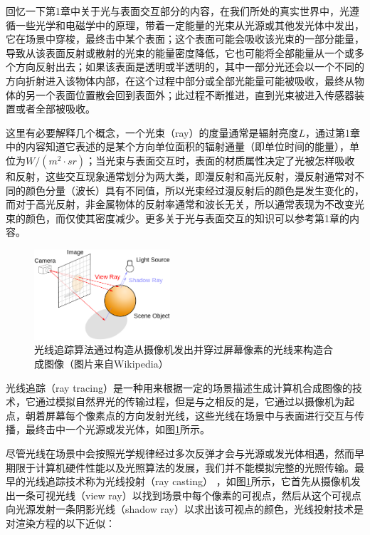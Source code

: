 回忆一下第1章中关于光与表面交互部分的内容，在我们所处的真实世界中，光遵循一些光学和电磁学中的原理，带着一定能量的光束从光源或其他发光体中发出，它在场景中穿梭，最终击中某个表面；这个表面可能会吸收该光束的一部分能量，导致从该表面反射或散射的光束的能量密度降低，它也可能将全部能量从一个或多个方向反射出去；如果该表面是透明或半透明的，其中一部分光还会以一个不同的方向折射进入该物体内部，在这个过程中部分或全部光能量可能被吸收，最终从物体的另一个表面位置散会回到表面外；此过程不断推进，直到光束被进入传感器装置或者全部被吸收。

这里有必要解释几个概念，一个光束（ray）的度量通常是辐射亮度$L$，通过第1章中的内容知道它表述的是某个方向单位面积的辐射通量（即单位时间的能量），单位为$W/(m^2\cdot sr)$；当光束与表面交互时，表面的材质属性决定了光被怎样吸收和反射，这些交互现象通常划分为两大类，即漫反射和高光反射，漫反射通常对不同的颜色分量（波长）具有不同值，所以光束经过漫反射后的颜色是发生变化的，而对于高光反射，非金属物体的反射率通常和波长无关，所以通常表现为不改变光束的颜色，而仅使其密度减少。更多关于光与表面交互的知识可以参考第1章的内容。

\begin{figure}
\sidecaption
	\includegraphics[width=0.45\textwidth]{figures/pt/path-1}
	\caption{光线追踪算法通过构造从摄像机发出并穿过屏幕像素的光线来构造合成图像（图片来自Wikipedia）}
	\label{f:pt-ray-tracing}
\end{figure}

光线追踪（ray tracing）是一种用来根据一定的场景描述生成计算机合成图像的技术，它通过模拟自然界光的传输过程，但是与之相反的是，它通过以摄像机为起点，朝着屏幕每个像素点的方向发射光线，这些光线在场景中与表面进行交互与传播，最终击中一个光源或发光体，如图\ref{f:pt-ray-tracing}所示。

尽管光线在场景中会按照光学规律经过多次反弹才会与光源或发光体相遇，然而早期限于计算机硬件性能以及光照算法的发展，我们并不能模拟完整的光照传输。最早的光线追踪技术称为光线投射（ray casting） \cite{a:Sometechniquesforshadingmachinerenderingsofsolids}，如图\ref{f:pt-ray-tracing}所示，它首先从摄像机发出一条可视光线（view ray）以找到场景中每个像素的可视点，然后从这个可视点向光源发射一条阴影光线（shadow ray）以求出该可视点的颜色，光线投射技术是对渲染方程的以下近似：

